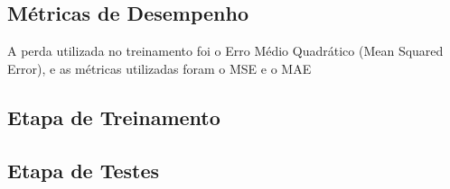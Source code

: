 \subsection{Métricas de Desempenho}
A perda utilizada no treinamento foi o Erro Médio Quadrático (Mean Squared Error), e as métricas utilizadas foram o MSE e o MAE

\subsection{Etapa de Treinamento}

\subsection{Etapa de Testes}
